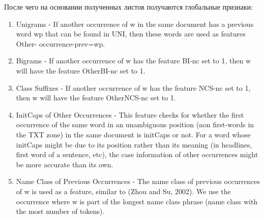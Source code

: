 После чего на основании полученных листов получаются глобальные признаки:

\begin{enumerate}
    \item Unigrams - If another occurrence of w in the same document has a previous word wp that can be found in UNI, then these words are used as features Other- occurrence-prev=wp.
    \item Bigrams - If another occurrence of w has the feature BI-nc set to 1, then w will have the feature OtherBI-nc set to 1.
    \item Class Suffixes - If another occurrence of w has the feature NCS-nc set to 1, then w will have the feature OtherNCS-nc set to 1.
    \item InitCaps of Other Occurrences - This feature checks for whether the first occurrence of the same word in an unambiguous position (non first-words in the TXT zone) in the same document is initCaps or not. For a word whose initCaps might be due to its position rather than its meaning (in headlines, first word of a sentence, etc), the case information of other occurrences might be more accurate than its own.
    \item Name Class of Previous Occurrences - The name class of previous occurrences of w is used as a feature, similar to (Zhou and Su, 2002). We use the occurrence where w is part of the longest name class phrase (name class with the most number of tokens).
\end{enumerate}

\fi